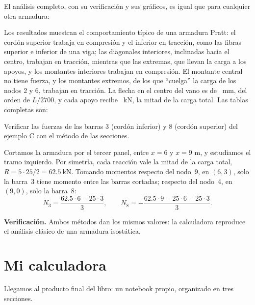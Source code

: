El análisis completo, con su verificación y sus gráficos, es igual que para
cualquier otra armadura:

Los resultados muestran el comportamiento típico de una armadura Pratt: el
cordón superior trabaja en compresión y el inferior en tracción, como las
fibras superior e inferior de una viga; las diagonales interiores, inclinadas
hacia el centro, trabajan en tracción, mientras que las extremas, que llevan
la carga a los apoyos, y los montantes interiores trabajan en compresión. El
montante central no tiene fuerza, y los montantes extremos, de los que
\enquote{cuelga} la carga de los nodos 2 y 6, trabajan en tracción. La flecha
en el centro del vano es de ~\si{\milli\metre}, del
orden de $L/2700$, y cada apoyo recibe ~\si{\kilo\newton},
la mitad de la carga total. Las tablas completas son:

\begin{problemaresuelto}
Verificar las fuerzas de las barras 3 (cordón inferior) y 8 (cordón superior)
del ejemplo C con el método de las secciones.

\solucion
Cortamos la armadura por el tercer panel, entre $x = 6$ y $x = 9$ m, y
estudiamos el tramo izquierdo. Por simetría, cada reacción vale la mitad de la
carga total, $R = 5 \cdot 25 / 2 = \SI{62.5}{\kilo\newton}$. Tomando momentos
respecto del nodo~9, en $(6, 3)$, solo la barra~3 tiene momento entre las
barras cortadas; respecto del nodo~4, en $(9, 0)$, solo la barra~8:
\[
  N_3 = \frac{62.5 \cdot 6 - 25 \cdot 3}{3}, \qquad
  N_8 = -\frac{62.5 \cdot 9 - 25 \cdot 6 - 25 \cdot 3}{3}.
\]

\textbf{Verificación.} Ambos métodos dan los mismos valores: la calculadora
reproduce el análisis clásico de una armadura isostática.
\end{problemaresuelto}

\section{Mi calculadora}\label{sec:mi_calculadora}

Llegamos al producto final del libro: un notebook propio, organizado en tres
secciones.

